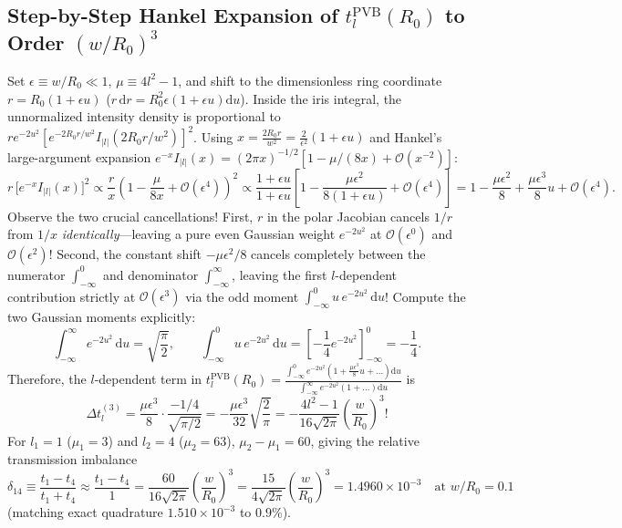 \documentclass[10pt,letterpaper]{article}
\newcommand{\abs}[1]{\lvert #1 \rvert}
\newcommand{\dd}{\mathrm{d}}
\numberwithin{equation}{section}
\begin{document}
\subsection{Step-by-Step Hankel Expansion of $t_l^{\mathrm{PVB}}(R_0)$ to Order $(w/R_0)^3$}
Set $\epsilon \equiv w/R_0 \ll 1$, $\mu \equiv 4l^2 - 1$, and shift to the dimensionless ring coordinate $r = R_0(1 + \epsilon u)$ ($r\,\dd r = R_0^2\epsilon(1+\epsilon u)\dd u$). Inside the iris integral, the unnormalized intensity density is proportional to $r e^{-2u^2} [e^{-2R_0 r/w^2} I_{\abs{l}}(2R_0 r/w^2)]^2$. Using $x = \frac{2R_0 r}{w^2} = \frac{2}{\epsilon^2}(1+\epsilon u)$ and Hankel's large-argument expansion $e^{-x} I_{\abs{l}}(x) = (2\pi x)^{-1/2}[1 - \mu/(8x) + \mathcal{O}(x^{-2})]$:
\begin{equation}
  r\,\bigl[e^{-x} I_{\abs{l}}(x)\bigr]^2 \propto \frac{r}{x}\left(1 - \frac{\mu}{8x} + \mathcal{O}(\epsilon^4)\right)^2 \propto \frac{1+\epsilon u}{1+\epsilon u}\left[1 - \frac{\mu\epsilon^2}{8(1+\epsilon u)} + \mathcal{O}(\epsilon^4)\right] = 1 - \frac{\mu\epsilon^2}{8} + \frac{\mu\epsilon^3}{8} u + \mathcal{O}(\epsilon^4).
\end{equation}
Observe the two crucial cancellations! First, $r$ in the polar Jacobian cancels $1/r$ from $1/x$ \emph{identically}---leaving a pure even Gaussian weight $e^{-2u^2}$ at $\mathcal{O}(\epsilon^0)$ and $\mathcal{O}(\epsilon^2)$! Second, the constant shift $-\mu\epsilon^2/8$ cancels completely between the numerator $\int_{-\infty}^0$ and denominator $\int_{-\infty}^\infty$, leaving the first $l$-dependent contribution strictly at $\mathcal{O}(\epsilon^3)$ via the odd moment $\int_{-\infty}^0 u\,e^{-2u^2}\,\dd u$! Compute the two Gaussian moments explicitly:
\begin{equation}
  \int_{-\infty}^\infty e^{-2u^2}\,\dd u = \sqrt{\frac{\pi}{2}}, \qquad
  \int_{-\infty}^0 u\,e^{-2u^2}\,\dd u = \left[-\frac{1}{4}e^{-2u^2}\right]_{-\infty}^0 = -\frac{1}{4}.
\end{equation}
Therefore, the $l$-dependent term in $t_l^{\mathrm{PVB}}(R_0) = \frac{\int_{-\infty}^0 e^{-2u^2}(1 + \frac{\mu\epsilon^3}{8}u + \dots)\dd u}{\int_{-\infty}^\infty e^{-2u^2}(1 + \dots)\dd u}$ is
\begin{equation}
  \Delta t_l^{(3)} = \frac{\mu\epsilon^3}{8}\cdot\frac{-1/4}{\sqrt{\pi/2}} = -\frac{\mu\epsilon^3}{32}\sqrt{\frac{2}{\pi}} = -\frac{4l^2 - 1}{16\sqrt{2\pi}}\left(\frac{w}{R_0}\right)^3!
  \label{eq:walk_t_pvb_3}
\end{equation}
For $l_1 = 1$ ($\mu_1 = 3$) and $l_2 = 4$ ($\mu_2 = 63$), $\mu_2 - \mu_1 = 60$, giving the relative transmission imbalance
\begin{equation}
  \delta_{14} \equiv \frac{t_1 - t_4}{t_1 + t_4} \approx \frac{t_1 - t_4}{1} = \frac{60}{16\sqrt{2\pi}}\left(\frac{w}{R_0}\right)^3 = \frac{15}{4\sqrt{2\pi}}\left(\frac{w}{R_0}\right)^3 = 1.4960\times 10^{-3}\quad\text{at }w/R_0 = 0.1
\end{equation}
(matching exact quadrature $1.510\times 10^{-3}$ to $0.9\%$).
\end{document}

